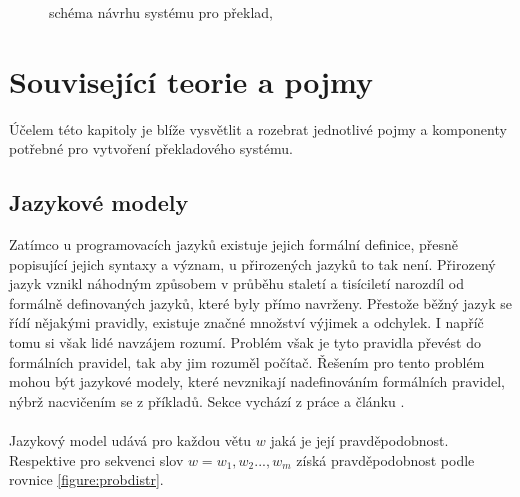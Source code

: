 \begin{figure}[h]
    \begin{center}
    \end{center}
	\caption{schéma návrhu systému pro překlad, }
	\label{img:draft}
\end{figure}


\chapter{Související teorie a pojmy}
Účelem této kapitoly je blíže vysvětlit a rozebrat jednotlivé pojmy a komponenty potřebné pro vytvoření překladového systému.



\section{Jazykové modely}\label{section:langmodel}
Zatímco u programovacích jazyků existuje jejich formální definice, přesně popisující jejich syntaxy a význam, u přirozených jazyků to tak není. Přirozený jazyk vznikl náhodným způsobem v průběhu staletí a tisíciletí narozdíl od formálně definovaných jazyků, které byly přímo navrženy. Přestože běžný jazyk se řídí nějakými pravidly, existuje značné množství výjimek a odchylek. I napříč tomu si však lidé navzájem rozumí. Problém však je tyto pravidla převést do formálních pravidel, tak aby jim rozuměl počítač. Řešením pro tento problém mohou být jazykové modely, které nevznikají nadefinováním formálních pravidel, nýbrž nacvičením se z příkladů. Sekce vychází z práce \cite{nmtThesis} a článku \cite{nmtTutorial}.
\\\\
Jazykový model udává pro každou větu $w$ jaká je její pravděpodobnost. Respektive pro sekvenci slov $w = w_1, w_2..., w_m$ získá pravděpodobnost podle rovnice \ref{figure:probdistr}.

